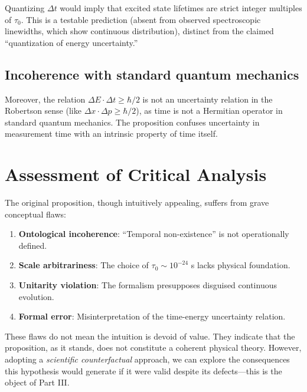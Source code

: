 \documentclass[11pt,a4paper]{article}
\begin{document}
Quantizing $\Delta t$ would imply that excited state lifetimes are strict integer multiples of $\tau_0$. This is a testable prediction (absent from observed spectroscopic linewidths, which show continuous distribution), distinct from the claimed ``quantization of energy uncertainty.''

\subsection{Incoherence with standard quantum mechanics}

Moreover, the relation $\Delta E \cdot \Delta t \geq \hbar/2$ is not an uncertainty relation in the Robertson sense (like $\Delta x \cdot \Delta p \geq \hbar/2$), as time is not a Hermitian operator in standard quantum mechanics. The proposition confuses uncertainty in measurement time with an intrinsic property of time itself.

\section{Assessment of Critical Analysis}

The original proposition, though intuitively appealing, suffers from grave conceptual flaws:

\begin{enumerate}[label=\arabic*.]
    \item \textbf{Ontological incoherence}: ``Temporal non-existence'' is not operationally defined.
    \item \textbf{Scale arbitrariness}: The choice of $\tau_0 \sim 10^{-24}$ s lacks physical foundation.
    \item \textbf{Unitarity violation}: The formalism presupposes disguised continuous evolution.
    \item \textbf{Formal error}: Misinterpretation of the time-energy uncertainty relation.
\end{enumerate}

These flaws do not mean the intuition is devoid of value. They indicate that the proposition, as it stands, does not constitute a coherent physical theory. However, adopting a \textit{scientific counterfactual} approach, we can explore the consequences this hypothesis would generate if it were valid despite its defects---this is the object of Part III.

\end{document}

